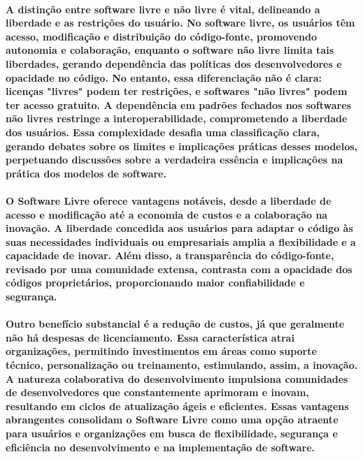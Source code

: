 \documentclass[a4paper, 12pt]{article}
\begin{document}
\paragraph{A distinção entre software livre e não livre é vital, delineando a liberdade e as restrições do usuário. No software livre, os usuários têm acesso, modificação e distribuição do código-fonte, promovendo autonomia e colaboração, enquanto o software não livre limita tais liberdades, gerando dependência das políticas dos desenvolvedores e opacidade no código. No entanto, essa diferenciação não é clara: licenças "livres" podem ter restrições, e softwares "não livres" podem ter acesso gratuito. A dependência em padrões fechados nos softwares não livres restringe a interoperabilidade, comprometendo a liberdade dos usuários. Essa complexidade desafia uma classificação clara, gerando debates sobre os limites e implicações práticas desses modelos, perpetuando discussões sobre a verdadeira essência e implicações na prática dos modelos de software.}

\paragraph{O Software Livre oferece vantagens notáveis, desde a liberdade de acesso e modificação até a economia de custos e a colaboração na inovação. A liberdade concedida aos usuários para adaptar o código às suas necessidades individuais ou empresariais amplia a flexibilidade e a capacidade de inovar. Além disso, a transparência do código-fonte, revisado por uma comunidade extensa, contrasta com a opacidade dos códigos proprietários, proporcionando maior confiabilidade e segurança.}
\paragraph{Outro benefício substancial é a redução de custos, já que geralmente não há despesas de licenciamento. Essa característica atrai organizações, permitindo investimentos em áreas como suporte técnico, personalização ou treinamento, estimulando, assim, a inovação. A natureza colaborativa do desenvolvimento impulsiona comunidades de desenvolvedores que constantemente aprimoram e inovam, resultando em ciclos de atualização ágeis e eficientes. Essas vantagens abrangentes consolidam o Software Livre como uma opção atraente para usuários e organizações em busca de flexibilidade, segurança e eficiência no desenvolvimento e na implementação de software.}
\end{document}
